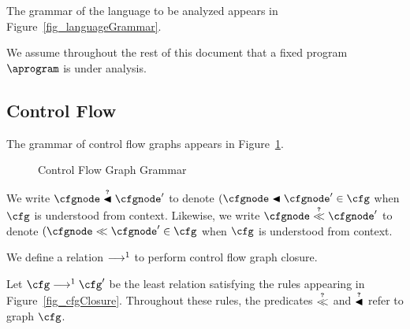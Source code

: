 \documentclass{article}
\begin{document}
    The grammar of the language to be analyzed appears in Figure~\ref{fig_languageGrammar}.

    We assume throughout the rest of this document that a fixed program $\aprogram$ is under analysis.  

    \subsection{Control Flow}

    The grammar of control flow graphs appears in Figure~\ref{fig_cfgGrammar}.  

    \begin{figure}\center
        \begin{grammar}
        \end{grammar}
        \caption{Control Flow Graph Grammar}
        \label{fig_cfgGrammar}
    \end{figure}



    We write $\cfgnode \islexicallyBefore \cfgnode'$ to denote $(\cfgnode \lexicallyBefore \cfgnode' \in \cfg$ when $\cfg$ is understood from context.  Likewise, we write $\cfgnode \isbefore \cfgnode'$ to denote $(\cfgnode \before \cfgnode' \in \cfg$ when $\cfg$ is understood from context.

    We define a relation $\mathrel{\longrightarrow^1}$ to perform control flow graph closure.

    \begin{definition}
        Let $\cfg \cfgClosureStep \cfg'$ be the least relation satisfying the rules appearing in Figure~\ref{fig_cfgClosure}.  Throughout these rules, the predicates $\isbefore$ and $\mathrel{\stackrel{{\scriptscriptstyle\boldsymbol{?}}}{\blacktriangleleft}}$ refer to graph $\cfg$.
    \end{definition}
\end{document}
